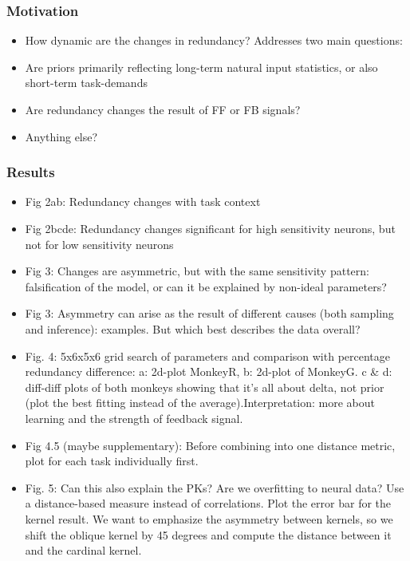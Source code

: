 \documentclass[lineno,pdflatex,sn-basic]{sn-jnl}%
\theoremstyle{thmstyleone}%
\theoremstyle{thmstyletwo}%
\theoremstyle{thmstylethree}%
\begin{document}
\subsubsection*{Motivation}
\begin{itemize}
    \item How dynamic are the changes in redundancy? Addresses two main questions:
    \item Are priors primarily reflecting long-term natural input statistics, or also short-term task-demands
    \item Are redundancy changes the result of FF or FB signals?
    \item Anything else?
\end{itemize}
\subsubsection*{Results}
\begin{itemize}
    \item Fig 2ab: Redundancy changes with task context
    \item Fig 2bcde: Redundancy changes significant for high sensitivity neurons, but not for low sensitivity neurons
    \item Fig 3: Changes are asymmetric, but with the same sensitivity pattern: falsification of the model, or can it be explained by non-ideal parameters?
    \item Fig 3: Asymmetry can arise as the result of different causes (both sampling and inference): examples. But which best describes the data overall?
    \item Fig. 4: 5x6x5x6 grid search of parameters and comparison with percentage redundancy difference: a: 2d-plot MonkeyR, b: 2d-plot of MonkeyG. c \& d: diff-diff plots of both monkeys showing that it's all about delta, not prior (plot the best fitting instead of the average).Interpretation: more about learning and the strength of feedback signal. 
    \item Fig 4.5 (maybe supplementary): Before combining into one distance metric, plot for each task individually first.
    \item Fig. 5: Can this also explain the PKs? Are we overfitting to neural data? Use a distance-based measure instead of correlations. Plot the error bar for the kernel result. We want to emphasize the asymmetry between kernels, so we shift the oblique kernel by 45 degrees and compute the distance between it and the cardinal kernel.
\end{itemize}
\end{document}
